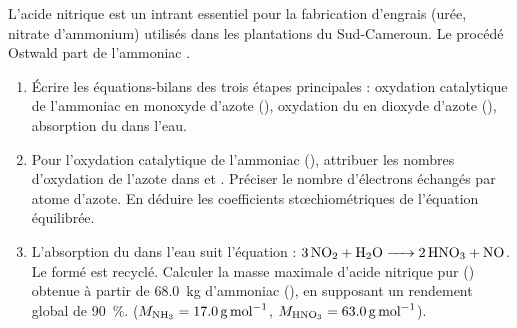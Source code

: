 \documentclass[11pt]{article}
\begin{document}
\begin{exercice}
L'acide nitrique est un intrant essentiel pour la fabrication d'engrais (urée, nitrate d'ammonium) utilisés dans les plantations du Sud-Cameroun. Le procédé Ostwald part de l'ammoniac .
\begin{enumerate}
    \item Écrire les équations-bilans des trois étapes principales : oxydation catalytique de l'ammoniac en monoxyde d'azote (), oxydation du  en dioxyde d'azote (), absorption du  dans l'eau.
    \item Pour l'oxydation catalytique de l'ammoniac (), attribuer les nombres d'oxydation de l'azote dans  et . Préciser le nombre d'électrons échangés par atome d'azote. En déduire les coefficients stœchiométriques de l'équation équilibrée.
    \item L'absorption du  dans l'eau suit l'équation : $\ce{3 NO2 + H2O -> 2 HNO3 + NO}$. Le  formé est recyclé. 
    Calculer la masse maximale d'acide nitrique pur () obtenue à partir de \SI{68,0}{\kilo\gram} d'ammoniac (), en supposant un rendement global de \SI{90}{\%}. ($M_{\ce{NH3}}=\SI{17,0}{\gram\per\mole}$, $M_{\ce{HNO3}}=\SI{63,0}{\gram\per\mole}$).
\end{enumerate}
\end{exercice}
\end{document}
